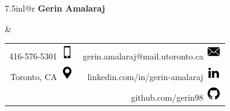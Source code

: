 \documentclass[letterpaper,11pt]{article}
\begin{document}
\begin{tabular*}{7.5in}{l@{\extracolsep{\fill}}r}
\textbf{
	\large Gerin Amalaraj}  

 & 
    \setlength{\tabcolsep}{20pt}
    \begin{tabular}[t]
    {r r}
    
 416-576-5301 \includegraphics[scale=1]{phone} & gerin.amalaraj@mail.utoronto.ca
    											        \includegraphics[scale=1]{mail} \\ 
 Toronto, CA  \includegraphics[scale=1]{gps}  &  linkedin.com/in/gerin-amalaraj
 														\includegraphics[scale=1]{linkedin} \\  
                                              & github.com/gerin98
                                               \includegraphics[scale=1]{github}    
\end{tabular}
 
\end{tabular*}
\\
\end{document}
